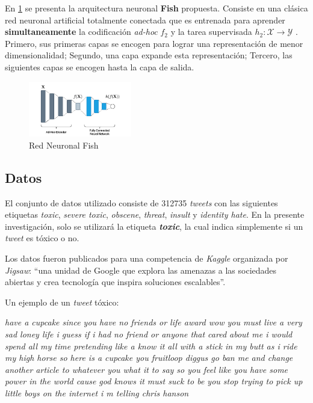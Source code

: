 En \ref{fig:fish} se presenta la arquitectura neuronal \textbf{Fish} propuesta. Consiste en una clásica red neuronal artificial totalmente conectada que es entrenada para aprender \textbf{simultaneamente} la codificación \textit{ad-hoc} $f_2$ y la tarea supervisada $h_2\colon \mathcal{X} \rightarrow \mathcal{Y}$ . Primero, sus primeras capas se encogen para lograr una representación de menor dimensionalidad; Segundo, una capa expande esta representación; Tercero, las siguientes capas se encogen hasta la capa de salida.

\begin{figure}[h]
\centering
\includegraphics[width=0.4\textwidth]{fish}
\caption{\label{fig:fish} Red Neuronal Fish}
\end{figure}

\subsection{Datos}

El conjunto de datos utilizado consiste de 312735 \textit{tweets} con las siguientes etiquetas \textit{toxic}, \textit{severe toxic}, \textit{obscene}, \textit{threat}, \textit{insult} y \textit{identity hate}. En la presente investigación, solo se utilizará la etiqueta \textbf{\textit{toxic}}, la cual indica simplemente si un \textit{tweet} es tóxico o no.

Los datos fueron publicados para una competencia de \textit{Kaggle} \cite{jigsaw-toxic-comment-classification-challenge} organizada por \textit{Jigsaw}: ``una unidad de Google que explora las amenazas a las sociedades abiertas y crea tecnología que inspira soluciones escalables''.

Un ejemplo de un \textit{tweet} tóxico: 

\textit{have a cupcake since you have no friends or life award wow you must live a very sad loney life i guess if i had no friend or anyone that cared about me i would spend all my time pretending like a know it all with a stick in my butt as i ride my high horse so here is a cupcake you fruitloop diggus go ban me and change another article to whatever you what it to say so you feel like you have some power in the world cause god knows it must suck to be you stop trying to pick up little boys on the internet i m telling chris hanson}

